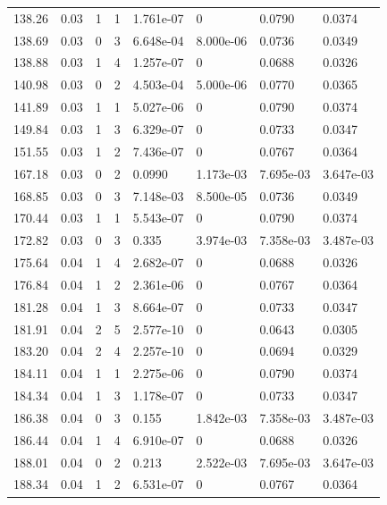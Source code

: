 \documentclass[preview]{standalone}
\begin{document}
{{{\begin{tabular}{L{1.2cm}C{1.2cm} C{0.3cm}C{0.5cm} C{1.4cm}C{1.4cm} C{1.4cm}C{1.4cm}}
  138.26  &  0.03  & 1     &  1 &  1.761e-07  & 0  & 0.0790 &  0.0374   \\ 
  138.69  &  0.03  & 0     &  3 &  6.648e-04  & 8.000e-06  & 0.0736 &  0.0349   \\ 
  138.88  &  0.03  & 1     &  4 &  1.257e-07  & 0  & 0.0688 &  0.0326   \\ 
  140.98  &  0.03  & 0     &  2 &  4.503e-04  & 5.000e-06  & 0.0770 &  0.0365   \\ 
  141.89  &  0.03  & 1     &  1 &  5.027e-06  & 0  & 0.0790 &  0.0374   \\ 
  149.84  &  0.03  & 1     &  3 &  6.329e-07  & 0  & 0.0733 &  0.0347   \\ 
  151.55  &  0.03  & 1     &  2 &  7.436e-07  & 0  & 0.0767 &  0.0364   \\ 
  167.18  &  0.03  & 0     &  2 &  0.0990  & 1.173e-03  & 7.695e-03 &  3.647e-03   \\ 
  168.85  &  0.03  & 0     &  3 &  7.148e-03  & 8.500e-05  & 0.0736 &  0.0349   \\ 
  170.44  &  0.03  & 1     &  1 &  5.543e-07  & 0  & 0.0790 &  0.0374   \\ 
  172.82  &  0.03  & 0     &  3 &  0.335  & 3.974e-03  & 7.358e-03 &  3.487e-03   \\ 
  175.64  &  0.04  & 1     &  4 &  2.682e-07  & 0  & 0.0688 &  0.0326   \\ 
  176.84  &  0.04  & 1     &  2 &  2.361e-06  & 0  & 0.0767 &  0.0364   \\ 
  181.28  &  0.04  & 1     &  3 &  8.664e-07  & 0  & 0.0733 &  0.0347   \\ 
  181.91  &  0.04  & 2     &  5 &  2.577e-10  & 0  & 0.0643 &  0.0305   \\ 
  183.20  &  0.04  & 2     &  4 &  2.257e-10  & 0  & 0.0694 &  0.0329   \\ 
  184.11  &  0.04  & 1     &  1 &  2.275e-06  & 0  & 0.0790 &  0.0374   \\ 
  184.34  &  0.04  & 1     &  3 &  1.178e-07  & 0  & 0.0733 &  0.0347   \\ 
  186.38  &  0.04  & 0     &  3 &  0.155  & 1.842e-03  & 7.358e-03 &  3.487e-03   \\ 
  186.44  &  0.04  & 1     &  4 &  6.910e-07  & 0  & 0.0688 &  0.0326   \\ 
  188.01  &  0.04  & 0     &  2 &  0.213  & 2.522e-03  & 7.695e-03 &  3.647e-03   \\ 
  188.34  &  0.04  & 1     &  2 &  6.531e-07  & 0  & 0.0767 &  0.0364   \\ 

\end{tabular}}}}
\end{document}
